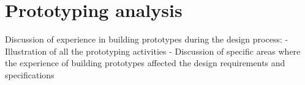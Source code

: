 \section{Prototyping analysis}

Discussion of experience in building prototypes during the design process:
- Illustration of all the prototyping activities
- Discussion of specific areas where the experience of building prototypes affected the design requirements and specifications